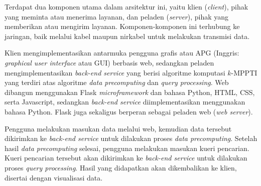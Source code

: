 Terdapat dua komponen utama dalam arsitektur ini, yaitu klien (\textit{client}), pihak yang meminta atau menerima layanan, dan peladen (\textit{server}), pihak yang memberikan atau mengirim layanan. Komponen-komponen ini terhubung ke jaringan, baik melalui kabel maupun nirkabel untuk melakukan transmisi data. 

Klien mengimplementasikan antarmuka pengguna grafis atau APG (Inggris: \textit{graphical user interface} atau GUI) berbasis web, sedangkan peladen mengimplementasikan \textit{back-end service} yang berisi algoritme komputasi $k$-MPPTI yang terdiri atas algoritme \textit{data precomputing} dan \textit{query processing}. Web dibangun menggunakan Flask \textit{microframework} dan bahasa Python, HTML, CSS, serta Javascript, sedangkan \textit{back-end service} diimplementasikan menggunakan bahasa Python. Flask juga sekaligus berperan sebagai peladen web (\textit{web server}).

Pengguna melakukan masukan data melalui web, kemudian data tersebut dikirimkan ke \textit{back-end service} untuk dilakukan proses \textit{data precomputing}. Setelah hasil \textit{data precomputing} selesai, pengguna melakukan masukan kueri pencarian. Kueri pencarian tersebut akan dikirimkan ke \textit{back-end service} untuk dilakukan proses \textit{query processing}. Hasil yang didapatkan akan dikembalikan ke klien, disertai dengan visualisasi data.
